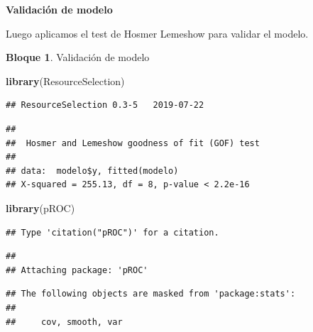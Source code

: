 \documentclass[]{book}
\newenvironment{Shaded}{\begin{snugshade}}{\end{snugshade}}
\newcommand{\CommentTok}[1]{\textcolor[rgb]{0.56,0.35,0.01}{\textit{#1}}}
\newcommand{\DataTypeTok}[1]{\textcolor[rgb]{0.13,0.29,0.53}{#1}}
\newcommand{\DecValTok}[1]{\textcolor[rgb]{0.00,0.00,0.81}{#1}}
\newcommand{\KeywordTok}[1]{\textcolor[rgb]{0.13,0.29,0.53}{\textbf{#1}}}
\newcommand{\NormalTok}[1]{#1}
\newcommand{\OperatorTok}[1]{\textcolor[rgb]{0.81,0.36,0.00}{\textbf{#1}}}
\theoremstyle{definition}
\theoremstyle{definition}
\newtheorem{example}{Bloque}[chapter]
\theoremstyle{definition}
\theoremstyle{definition}
\theoremstyle{remark}
\begin{document}
\textbf{Validación de modelo}

Luego aplicamos el test de Hosmer Lemeshow para validar el modelo.

\begin{example}
\protect\hypertarget{exm:bloque17nbm}{}{\label{exm:bloque17nbm} }Validación de modelo
\end{example}

\begin{Shaded}
\begin{Highlighting}[]
\KeywordTok{library}\NormalTok{(ResourceSelection)}
\end{Highlighting}
\end{Shaded}

\begin{verbatim}
## ResourceSelection 0.3-5   2019-07-22
\end{verbatim}

\begin{Shaded}
\end{Shaded}

\begin{verbatim}
## 
##  Hosmer and Lemeshow goodness of fit (GOF) test
## 
## data:  modelo$y, fitted(modelo)
## X-squared = 255.13, df = 8, p-value < 2.2e-16
\end{verbatim}

\begin{Shaded}
\begin{Highlighting}[]
\KeywordTok{library}\NormalTok{(pROC)}
\end{Highlighting}
\end{Shaded}

\begin{verbatim}
## Type 'citation("pROC")' for a citation.
\end{verbatim}

\begin{verbatim}
## 
## Attaching package: 'pROC'
\end{verbatim}

\begin{verbatim}
## The following objects are masked from 'package:stats':
## 
##     cov, smooth, var
\end{verbatim}
\end{document}
